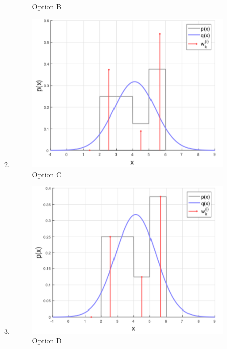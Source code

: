 \begin{enumerate}
\begin{enumerate}
\begin{figure}[!htb]
\begin{center}
\end{center}
\caption{Option B}
\label{P6b_importancesampling}
\end{figure}
\item \begin{figure}[!htb]
\begin{center}
\includegraphics[scale=0.320]{img/particle_filters/P6c_importancesampling.png}
\end{center}
\caption{Option C}
\label{P6c_importancesampling}
\end{figure}
\item \begin{figure}[!htb]
\begin{center}
\includegraphics[scale=0.320]{img/particle_filters/P6d_importancesampling.png}
\end{center}
\caption{Option D}
\label{P6d_importancesampling}
\end{figure}
\end{enumerate}


\end{enumerate}
